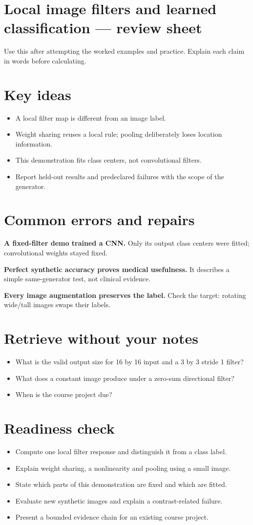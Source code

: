 \documentclass[11pt,letterpaper]{article}
\theoremstyle{definition}\newtheorem{definition}{Definition}\newtheorem{example}{Example}
\numberwithin{equation}{section}
\begin{document}
\section*{Local image filters and learned classification --- review sheet}
Use this after attempting the worked examples and practice. Explain each claim in words before calculating.

\section*{Key ideas}
\begin{itemize}
\item A local filter map is different from an image label.
\item Weight sharing reuses a local rule; pooling deliberately loses location information.
\item This demonstration fits class centers, not convolutional filters.
\item Report held-out results and predeclared failures with the scope of the generator.
\end{itemize}
\section*{Common errors and repairs}
\textbf{A fixed-filter demo trained a CNN.} Only its output class centers were fitted; convolutional weights stayed fixed.

\textbf{Perfect synthetic accuracy proves medical usefulness.} It describes a simple same-generator test, not clinical evidence.

\textbf{Every image augmentation preserves the label.} Check the target: rotating wide/tall images swaps their labels.

\section*{Retrieve without your notes}
\begin{itemize}
\item What is the valid output size for 16 by 16 input and a 3 by 3 stride 1 filter?
\item What does a constant image produce under a zero-sum directional filter?
\item When is the course project due?
\end{itemize}
\section*{Readiness check}
\begin{itemize}
\item Compute one local filter response and distinguish it from a class label.
\item Explain weight sharing, a nonlinearity and pooling using a small image.
\item State which parts of this demonstration are fixed and which are fitted.
\item Evaluate new synthetic images and explain a contrast-related failure.
\item Present a bounded evidence chain for an existing course project.
\end{itemize}
\end{document}
